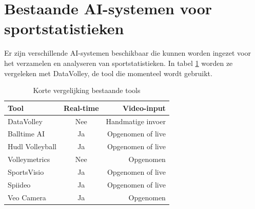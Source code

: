 \section{Bestaande AI-systemen voor sportstatistieken}
Er zijn verschillende AI-systemen beschikbaar die kunnen worden ingezet voor het verzamelen en analyseren van sportstatistieken. In tabel \ref{tab:tools} worden ze vergeleken met DataVolley, de tool die momenteel wordt gebruikt.

\begin{table}
  \centering
  \begin{tabular}{lcr}
    \toprule
    \textbf{Tool} & \textbf{Real-time} & \textbf{Video-input}\\
    \midrule
    DataVolley & Nee & Handmatige invoer \\
    Balltime AI & Ja & Opgenomen of live \\
    Hudl Volleyball & Ja & Opgenomen of live \\
    Volleymetrics & Nee & Opgenomen \\
    SportsVisio & Ja & Opgenomen of live \\
    Spiideo & Ja & Opgenomen of live \\
    Veo Camera & Ja & Opgenomen \\
    \bottomrule
  \end{tabular}
  \caption[Korte vergelijking bestaande tools]{\label{tab:tools}Korte vergelijking bestaande tools}
\end{table}